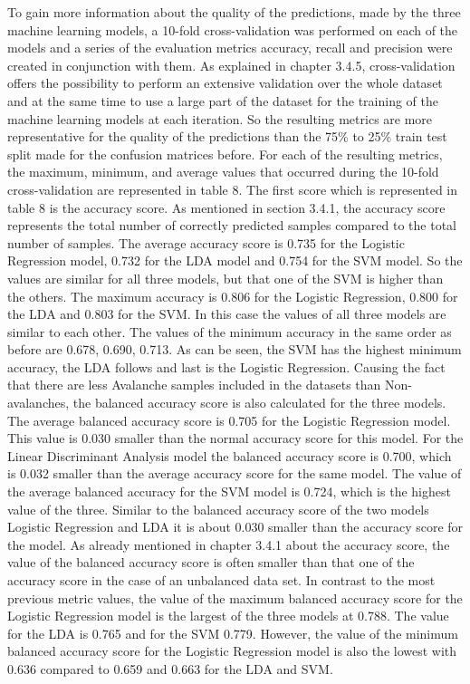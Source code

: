 \documentclass[../masterarbeit.tex]{subfiles}
\begin{document}
To gain more information about the quality of the predictions, made by the three machine learning models, a 10-fold cross-validation was performed on each of the models and a series of the evaluation metrics accuracy, recall and precision were created in conjunction with them. As explained in chapter 3.4.5, cross-validation offers the possibility to perform an extensive validation over the whole dataset and at the same time to use a large part of the dataset for the training of the machine learning models at each iteration. So the resulting metrics are more representative for the quality of the predictions than the 75\% to 25\% train test split made for the confusion matrices before. For each of the resulting metrics, the maximum, minimum, and average values that occurred during the 10-fold cross-validation are represented in table 8. The first score which is represented in table 8 is the accuracy score. As mentioned in section 3.4.1, the accuracy score represents the total number of correctly predicted samples compared to the total number of samples. The average accuracy score is 0.735 for the Logistic Regression model, 0.732 for the LDA model and 0.754 for the SVM model. So the values are similar for all three models, but that one of the SVM is higher than the others. The maximum accuracy is 0.806 for the Logistic Regression, 0.800 for the LDA and 0.803 for the SVM. In this case the values of all three models are similar to each other. The values of the minimum accuracy in the same order as before are 0.678, 0.690, 0.713. As can be seen, the SVM has the highest minimum accuracy, the LDA follows and last is the Logistic Regression. Causing the fact that there are less Avalanche samples included in the datasets than Non-avalanches, the balanced accuracy score is also calculated for the three models. The average balanced accuracy score is 0.705 for the Logistic Regression model. This value is 0.030 smaller than the normal accuracy score for this model. For the Linear Discriminant Analysis model the balanced accuracy score is 0.700, which is 0.032 smaller than the average accuracy score for the same model. The value of the average balanced accuracy for the SVM model is 0.724, which is the highest value of the three. Similar to the balanced accuracy score of the two models Logistic Regression and LDA it is about 0.030 smaller than the accuracy score for the model. As already mentioned in chapter 3.4.1 about the accuracy score, the value of the balanced accuracy score is often smaller than that one of the accuracy score in the case of an unbalanced data set. In contrast to the most previous metric values, the value of the maximum balanced accuracy score for the Logistic Regression model is the largest of the three models at 0.788. The value for the LDA is 0.765 and for the SVM 0.779. However, the value of the minimum balanced accuracy score for the Logistic Regression model is also the lowest with 0.636 compared to 0.659 and 0.663 for the LDA and SVM. \\~\\
\end{document}
